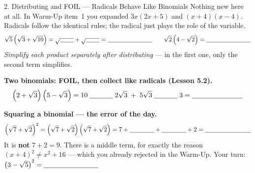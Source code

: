 \documentclass[10pt]{article}
\begin{document}
\begin{notesbox}{2. Distributing and FOIL --- Radicals Behave Like Binomials}
Nothing new here at all. In Warm-Up item~1 you expanded $3x(2x+5)$ and $(x+4)(x-4)$. Radicals
follow the identical rules; the radical just plays the role of the variable.
\[
  \sqrt{5}\left(\sqrt{3}+\sqrt{10}\right)
  = \sqrt{\blank{0.8cm}}+\sqrt{\blank{0.8cm}} = \blank{2.6cm}
  \qquad
  \sqrt{2}\left(4-\sqrt{2}\right)=\blank{2.6cm}
\]
\emph{Simplify each product separately after distributing} --- in the first one, only the second
term simplifies.

\vspace{3pt}
\textbf{Two binomials: FOIL, then collect like radicals (Lesson 5.2).}
\[
  \left(2+\sqrt3\right)\left(5-\sqrt3\right)
  = 10 \;\blank{1.2cm}\; 2\sqrt3 \;+\; 5\sqrt3 \;\blank{1.2cm}\; 3
  = \blank{2.6cm}
\]

\vspace{3pt}
\textbf{Squaring a binomial --- the error of the day.}
\[
  \left(\sqrt7+\sqrt2\right)^{2}
  = \left(\sqrt7+\sqrt2\right)\left(\sqrt7+\sqrt2\right)
  = 7 + \blank{1.4cm} + \blank{1.4cm} + 2 = \blank{2.6cm}
\]
It is \textbf{not} $7+2=9$. There is a middle term, for exactly the reason
$(x+4)^{2}\ne x^{2}+16$ --- which you already rejected in the Warm-Up. \; Your turn:
\; $\left(3-\sqrt5\right)^{2}=\blank{2.8cm}$
\end{notesbox}
\end{document}
